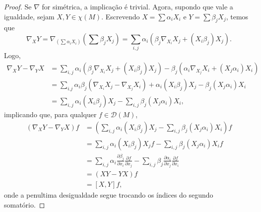 \begin{proposition}
\begin{proof}
        Se $\nabla$ for simétrica, a implicação é trivial. Agora, supondo que vale a igualdade, sejam $X,Y \in \chi(M)$. Escrevendo $X=\sum\alpha_{i}X_{i}$ e $Y=\sum\beta_{j}X_{j}$, temos que
        \begin{equation*}
            \nabla _{X}Y=\nabla_{\left( \sum\alpha_{i}X_{i} \right)}\left( \sum \beta_{j}X_{j} \right)=\sum_{i,j}\alpha_{i}(\beta_{j}\nabla_{X_{i}}X_{j}+(X_{i}\beta_{j})X_{j}).
        \end{equation*}
        Logo,
        \begin{align*}
            \nabla_{X}Y-\nabla_{Y}X & =\sum_{i,j}\alpha _{i}(\beta_{j}\nabla_{X_{i}}X_{j}+(X_{i}\beta_{j})X_{j})-\beta_{j}(\alpha_{i}\nabla_{X_{j}}X_{i}+(X_{j}\alpha_{i})X_{i}) \\
                                    & = \sum_{i.j}\alpha_{i}\beta_{j}(\nabla_{X_{i}}X_{j}-\nabla_{X_{j}}X_{i})+\alpha_{i}(X_{i}\beta_{j})X_{j}-\beta_{j}(X_{j}\alpha_{i})X_{i}   \\
                                    & = \sum_{i,j}\alpha_{i}(X_{i}\beta_{j})X_{j}- \sum_{i,j}\beta_{j}(X_{j}\alpha_{i})X_{i},
        \end{align*}
        implicando que, para qualquer $f \in \mathcal{D}(M)$,
        \begin{align*}
            (\nabla_{X}Y-\nabla_{Y}X)f & =\left( \sum_{i,j}\alpha_{i}(X_{i}\beta_{j})X_{j}- \sum_{i,j}\beta_{j}(X_{j}\alpha_{i})X_{i} \right)f                                                                                          \\
                                       & = \sum_{i,j}\alpha_{i}(X_{i}\beta_{j})X_{j}f- \sum_{i,j}\beta_{j}(X_{j}\alpha_{i})X_{i}f                                                                                                       \\
                                       & =\sum_{i,j}\alpha_{i}\frac{\partial\beta_{j}}{\partial x_{i}}\frac{\partial f}{\partial x_{j}} - \sum_{i,j}\beta_{j}\frac{\partial\alpha_{i}}{\partial x_{j}}\frac{\partial f}{\partial x_{i}} \\
                                       & = (XY-YX)f                                                                                                                                                                                     \\
                                       & = [X,Y]f,
        \end{align*}
        onde a penultima desigualdade segue trocando os índices do segundo somatório.
    \end{proof}
\end{proposition}

